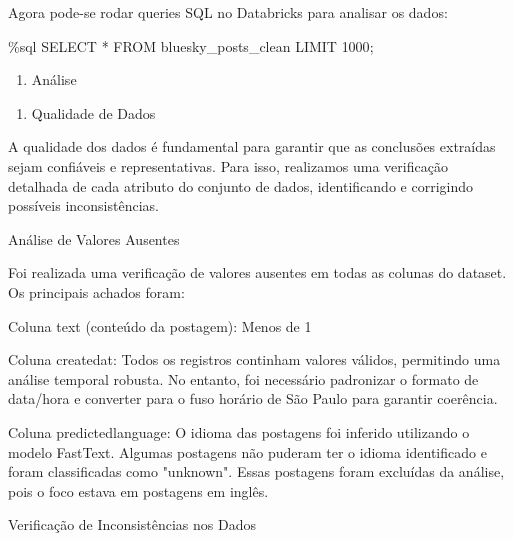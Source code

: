 \documentclass[
  letterpaper,
  DIV=11,
  numbers=noendperiod]{scrartcl}
\newenvironment{Shaded}{\begin{snugshade}}{\end{snugshade}}
\newcommand{\DecValTok}[1]{\textcolor[rgb]{0.68,0.00,0.00}{#1}}
\newcommand{\NormalTok}[1]{\textcolor[rgb]{0.00,0.23,0.31}{#1}}
\newcommand{\OperatorTok}[1]{\textcolor[rgb]{0.37,0.37,0.37}{#1}}
\providecommand{\tightlist}{%
  \setlength{\itemsep}{0pt}\setlength{\parskip}{0pt}}\usepackage{longtable,booktabs,array}
\begin{document}
Agora pode-se rodar queries SQL no Databricks para analisar os dados:

\begin{Shaded}
\begin{Highlighting}[]
\OperatorTok{\%}\NormalTok{sql}
\NormalTok{SELECT }\OperatorTok{*}\NormalTok{ FROM bluesky\_posts\_clean LIMIT }\DecValTok{1000}\OperatorTok{;}
\end{Highlighting}
\end{Shaded}

\begin{enumerate}
\def\labelenumi{\arabic{enumi}.}
\setcounter{enumi}{4}
\tightlist
\item
  Análise 
\end{enumerate}

\begin{enumerate}
\def\labelenumi{\alph{enumi}.}
\tightlist
\item
  Qualidade de Dados
\end{enumerate}

A qualidade dos dados é fundamental para garantir que as conclusões
extraídas sejam confiáveis e representativas. Para isso, realizamos uma
verificação detalhada de cada atributo do conjunto de dados,
identificando e corrigindo possíveis inconsistências.

\begin{VerbatimWithBreaks}
Análise de Valores Ausentes 
 
\end{VerbatimWithBreaks}

Foi realizada uma verificação de valores ausentes em todas as colunas do
dataset. Os principais achados foram:

\begin{VerbatimWithBreaks}
Coluna text (conteúdo da postagem):  Menos de 1%

Coluna created\textunderscore at:  Todos os registros continham valores válidos, permitindo uma análise temporal robusta. No entanto, foi necessário padronizar o formato de data/hora e converter para o fuso horário de São Paulo para garantir coerência. 

Coluna predicted\textunderscore language:  O idioma das postagens foi inferido utilizando o modelo FastText. Algumas postagens não puderam ter o idioma identificado e foram classificadas como "unknown". Essas postagens foram excluídas da análise, pois o foco estava em postagens em inglês. 
 

Verificação de Inconsistências nos Dados 
 
\end{VerbatimWithBreaks}
\end{document}
